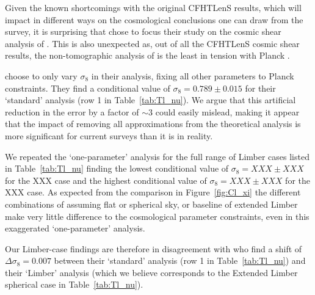 Given the known shortcomings with the original CFHTLenS results, which will impact in different ways on the cosmological conclusions one can draw from the survey, it is surprising that \citet{kitching/etal:2016} chose to focus their study on the cosmic shear analysis of \citet{kilbinger/etal:2013}.  This is also unexpected as, out of all the CFHTLenS cosmic shear results, the non-tomographic analysis of \citet{kilbinger/etal:2013} is the least in tension with Planck \citep[see for example][who show that with $\sigma_8 (\Omega_m/0.3)^{0.5} = 0.738^{+0.055}_{-0.032}$, \citet{kilbinger/etal:2013} is in agreement with Planck at $1.6 \sigma$]{abbott/etal:2016}.

\citet{kitching/etal:2016} choose to only vary $\sigma_8$ in their analysis, fixing all other parameters to Planck constraints.  They find a conditional value of $\sigma_8 = 0.789 \pm 0.015$ for their `standard' analysis (row 1 in Table~\ref{tab:Tl_nu}).    We argue that this artificial reduction in the error by a factor of $\sim 3$ could easily mislead, making it appear that the impact of removing all approximations from the theoretical analysis is more significant for current surveys than it is in reality.

We repeated the `one-parameter' analysis for the full range of Limber cases listed in Table~\ref{tab:Tl_nu} finding the lowest conditional value of $\sigma_8 = XXX \pm XXX$ for the XXX case and the highest conditional value of $\sigma_8 = XXX \pm XXX$ for the XXX case.  As expected from the comparison in Figure~\ref{fig:Cl_xi} the different combinations of assuming flat or spherical sky, or baseline of extended Limber make very little difference to the cosmological parameter constraints, even in this exaggerated `one-parameter' analysis.  

Our Limber-case findings are therefore in disagreement with \citet{kitching/etal:2016} who find a shift of $\Delta \sigma_8 = 0.007$ between their `standard' analysis (row 1 in Table~\ref{tab:Tl_nu}) and their `Limber' analysis (which we believe corresponds to the Extended Limber spherical case in Table~\ref{tab:Tl_nu}).


